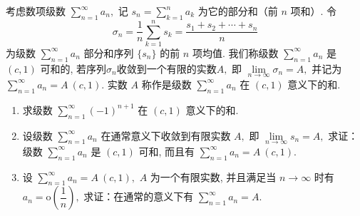 \begin{question}[points = 12]
  考虑数项级数 $\sum\limits_{n=1}^{\infty} a_n,$ 记 $s_n = \sum\limits_{k=1}^n a_k$ 为它的部分和（前 $n$ 项和）. 令
  $$\sigma_n = \dfrac{1}{n} \sum\limits_{k=1}^n s_k = \dfrac{s_1 + s_2 + \cdots + s_n}{n}$$
  为级数 $\sum\limits_{n=1}^{\infty} a_n$ 部分和序列 $\{s_n\}$ 的前 $n$ 项均值. 我们称级数 $\sum\limits_{n=1}^{\infty} a_n$ 是 $(c, 1)$ 可和的, 若序列$\sigma_n$收敛到一个有限的实数$A,$ 即 $\lim\limits_{n \to \infty} \sigma_n = A,$ 并记为 $\sum\limits_{n=1}^{\infty} a_n = A~(c, 1).$ 实数 $A$ 称作是级数 $\sum\limits_{n=1}^{\infty} a_n$ 在 $(c, 1)$ 意义下的和.
  \begin{enumerate}
  \item 求级数 $\sum\limits_{n=1}^{\infty} (-1)^{n+1}$ 在 $(c, 1)$ 意义下的和.
  \item 设级数 $\sum\limits_{n=1}^{\infty} a_n$ 在通常意义下收敛到有限实数 $A,$ 即 $\lim\limits_{n \to \infty} s_n = A,$ 求证：级数 $\sum\limits_{n=1}^{\infty} a_n$ 是 $(c, 1)$ 可和, 而且有 $\sum\limits_{n=1}^{\infty} a_n = A~(c, 1).$
  \item 设 $\sum\limits_{n=1}^{\infty} a_n = A~(c, 1),$ $A$ 为一个有限实数, 并且满足当 $n \to \infty$ 时有 $a_n = \mathrm{o}\left( \dfrac{1}{n} \right),$ 求证：在通常的意义下有 $\sum\limits_{n=1}^{\infty} a_n = A.$
  \end{enumerate}

\end{question}

